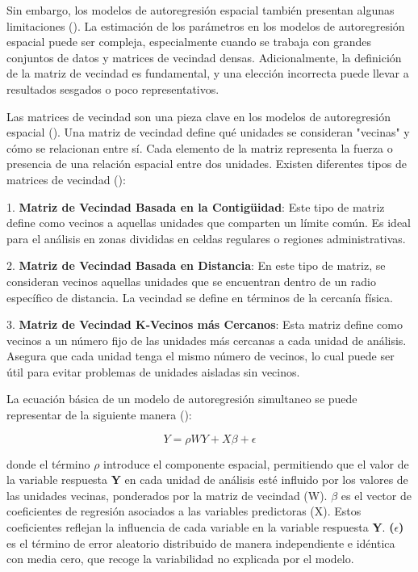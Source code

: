\documentclass[
  manuscript=article,  
  layout=preprint,  
  year=2023,
  volume=0,
]{format}
\begin{document}
Sin embargo, los modelos de autoregresión espacial también presentan algunas limitaciones (\cite{lesage2011pitfalls, anselin2022spatial}). La estimación de los parámetros en los modelos de autoregresión espacial puede ser compleja, especialmente cuando se trabaja con grandes conjuntos de datos y matrices de vecindad densas. Adicionalmente, la definición de la matriz de vecindad es fundamental, y una elección incorrecta puede llevar a resultados sesgados o poco representativos.

Las matrices de vecindad son una pieza clave en los modelos de autoregresión espacial (\cite{earnest2007evaluating}). Una matriz de vecindad define qué unidades se consideran "vecinas" y cómo se relacionan entre sí. Cada elemento de la matriz representa la fuerza o presencia de una relación espacial entre dos unidades. Existen diferentes tipos de matrices de vecindad (\cite{earnest2007evaluating, getis2009spatial, stakhovych2009specification}):

1. \textbf{Matriz de Vecindad Basada en la Contigüidad}: Este tipo de matriz define como vecinos a aquellas unidades que comparten un límite común. Es ideal para el análisis en zonas divididas en celdas regulares o regiones administrativas.

2. \textbf{Matriz de Vecindad Basada en Distancia}: En este tipo de matriz, se consideran vecinos aquellas unidades que se encuentran dentro de un radio específico de distancia. La vecindad se define en términos de la cercanía física.

3. \textbf{Matriz de Vecindad K-Vecinos más Cercanos}: Esta matriz define como vecinos a un número fijo de las unidades más cercanas a cada unidad de análisis. Asegura que cada unidad tenga el mismo número de vecinos, lo cual puede ser útil para evitar problemas de unidades aisladas sin vecinos.

La ecuación básica de un modelo de autoregresión simultaneo se puede representar de la siguiente manera (\cite{cliff1981spatial, kelejian2007relative, lesage2009introduction}):

\begin{equation}
Y = \rho W Y + X \beta + \epsilon
\end{equation}

donde el término $\rho$ introduce el componente espacial, permitiendo que el valor de la variable respuesta \textbf{Y} en cada unidad de análisis esté influido por los valores de las unidades vecinas, ponderados por la matriz de vecindad (W). \textbf{$\beta$} es el vector de coeficientes de regresión asociados a las variables predictoras (X). Estos coeficientes reflejan la influencia de cada variable en la variable respuesta \textbf{Y}. \textbf{($\epsilon$)} es el término de error aleatorio distribuido de manera independiente e idéntica con media cero, que recoge la variabilidad no explicada por el modelo. 
\end{document}
